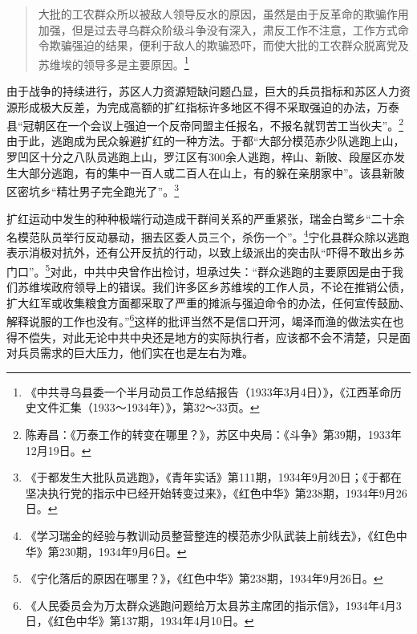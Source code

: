 \begin{quote}

大批的工农群众所以被敌人领导反水的原因，虽然是由于反革命的欺骗作用加强，但是过去寻乌群众阶级斗争没有深入，肃反工作不注意，工作方式命令欺骗强迫的结果，便利于敌人的欺骗恐吓，而使大批的工农群众脱离党及苏维埃的领导多是主要原因。\footnote{《中共寻乌县委一个半月动员工作总结报告（1933年3月4日）》，《江西革命历史文件汇集（1933～1934年）》，第32～33页。}
\end{quote}


由于战争的持续进行，苏区人力资源短缺问题凸显，巨大的兵员指标和苏区人力资源形成极大反差，为完成高额的扩红指标许多地区不得不采取强迫的办法，万泰县“冠朝区在一个会议上强迫一个反帝同盟主任报名，不报名就罚苦工当伙夫”。\footnote{陈寿昌：《万泰工作的转变在哪里？》，苏区中央局：《斗争》第39期，1933年12月19日。}由于此，逃跑成为民众躲避扩红的一种方法。于都“大部分模范赤少队逃跑上山，罗凹区十分之八队员逃跑上山，罗江区有300余人逃跑，梓山、新陂、段屋区亦发生大部分逃跑，有的集中一百人或二百人在山上，有的躲在亲朋家中”。该县新陂区密坑乡“精壮男子完全跑光了”。\footnote{《于都发生大批队员逃跑》，《青年实话》第111期，1934年9月20日；《于都在坚决执行党的指示中已经开始转变过来》，《红色中华》第238期，1934年9月26日。}


扩红运动中发生的种种极端行动造成干群间关系的严重紧张，瑞金白鹭乡“二十余名模范队员举行反动暴动，捆去区委人员三个，杀伤一个”。\footnote{《学习瑞金的经验与教训动员整营整连的模范赤少队武装上前线去》，《红色中华》第230期，1934年9月6日。}宁化县群众除以逃跑表示消极对抗外，还有公开反抗的行动，以致上级派出的突击队“吓得不敢出乡苏门口”。\footnote{《宁化落后的原因在哪里？》，《红色中华》第238期，1934年9月26日。}对此，中共中央曾作出检讨，坦承过失：“群众逃跑的主要原因是由于我们苏维埃政府领导上的错误。我们许多区乡苏维埃的工作人员，不论在推销公债，扩大红军或收集粮食方面都采取了严重的摊派与强迫命令的办法，任何宣传鼓励、解释说服的工作也没有。”\footnote{《人民委员会为万太群众逃跑问题给万太县苏主席团的指示信》，1934年4月3日，《红色中华》第137期，1934年4月10日。}这样的批评当然不是信口开河，竭泽而渔的做法实在也得不偿失，对此无论中共中央还是地方的实际执行者，应该都不会不清楚，只是面对兵员需求的巨大压力，他们实在也是左右为难。


